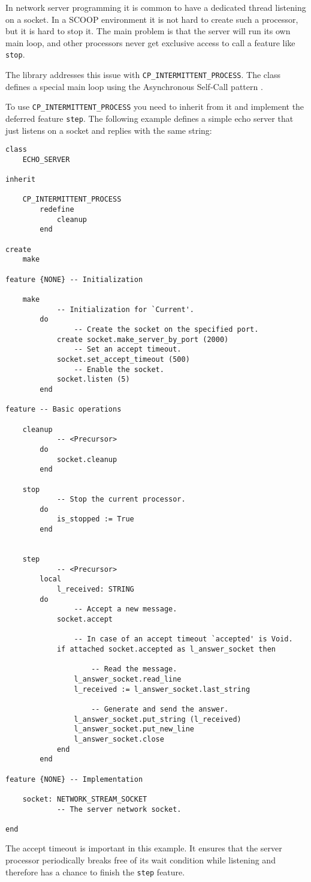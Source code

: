 In network server programming it is common to have a dedicated thread listening on a socket.
In a SCOOP environment it is not hard to create such a processor, but it is hard to stop it.
The main problem is that the server will run its own main loop, and other processors never get exclusive access to call a feature like \lstinline!stop!.

The library addresses this issue with \lstinline!CP_INTERMITTENT_PROCESS!.
The class defines a special main loop using the Asynchronous Self-Call pattern .

To use \lstinline!CP_INTERMITTENT_PROCESS! you need to inherit from it and implement the deferred feature \lstinline!step!.
The following example defines a simple echo server that just listens on a socket and replies with the same string:

\begin{lstlisting}[language=OOSC2Eiffel, captionpos=b, caption={The echo server class.}]
class
	ECHO_SERVER

inherit

	CP_INTERMITTENT_PROCESS
		redefine
			cleanup
		end

create
	make

feature {NONE} -- Initialization

	make
			-- Initialization for `Current'.
		do
				-- Create the socket on the specified port.
			create socket.make_server_by_port (2000)
				-- Set an accept timeout.
			socket.set_accept_timeout (500)
				-- Enable the socket.
			socket.listen (5)
		end

feature -- Basic operations

	cleanup
			-- <Precursor>
		do
			socket.cleanup
		end

	stop
			-- Stop the current processor.
		do
			is_stopped := True
		end

		
	step
			-- <Precursor>
		local
			l_received: STRING
		do
				-- Accept a new message.
			socket.accept
			
				-- In case of an accept timeout `accepted' is Void.
			if attached socket.accepted as l_answer_socket then

					-- Read the message.
				l_answer_socket.read_line
				l_received := l_answer_socket.last_string

					-- Generate and send the answer.
				l_answer_socket.put_string (l_received)
				l_answer_socket.put_new_line
				l_answer_socket.close
			end
		end

feature {NONE} -- Implementation

	socket: NETWORK_STREAM_SOCKET
			-- The server network socket.

end
\end{lstlisting}
The accept timeout is important in this example.
It ensures that the server processor periodically breaks free of its wait condition while listening and therefore has a chance to finish the \lstinline!step! feature.


